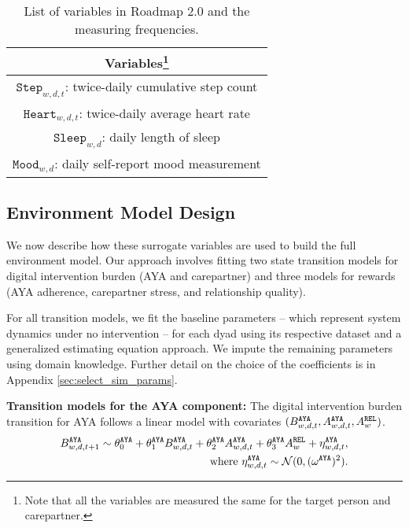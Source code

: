 \begin{table}[hpt]
    \centering
    \caption{List of variables in Roadmap 2.0 and the measuring frequencies.}
    \begin{tabular}{c}
    \hline
    Variables\footnote{Note that all the variables are measured the same for the target person and carepartner.} \\
    \hline
    \hline
     $\texttt{Step}_{w, d, t}$: twice-daily cumulative step count\\
     $\texttt{Heart}_{w, d, t}$: twice-daily average heart rate\\
     $\texttt{Sleep}_{w, d}$: daily length of sleep\\
     $\texttt{Mood}_{w, d}$: daily self-report mood measurement\\
     \hline
    \end{tabular}
    \label{tab:roadmap_variable}
\end{table}

\subsection{Environment Model Design}

We now describe how these surrogate variables are used to build the full environment model. Our approach involves fitting two state transition models for digital intervention burden (AYA and carepartner) and three models for rewards (AYA adherence, carepartner stress, and relationship quality).

For all transition models, we fit the baseline parameters -- which represent system dynamics under no intervention --  for each dyad using its respective dataset and a generalized estimating equation \cite{hojsgaard2006r} approach. We impute the remaining parameters  using domain knowledge. Further detail on the choice of the coefficients is in Appendix \ref{sec:select_sim_params}. 

\textbf{Transition models for the AYA component: } The digital intervention burden transition for AYA follows a linear model with covariates $(B_{w,d,t}^{\tiny\texttt{AYA}}, A_{w,d,t}^{\tiny\texttt{AYA}}, A_{w}^{\tiny\texttt{REL}})$.
\begin{align}
\label{equ:B_transition_AYA}
    B_{w,d,t+1}^{\tiny\texttt{AYA}} \sim \theta^{\tiny\texttt{AYA}}_{0} + \theta_{1}^{\tiny\texttt{AYA}} B_{w,d,t}^{\tiny\texttt{AYA}} + \theta_{2}^{\tiny\texttt{AYA}} A_{w,d,t}^{\tiny\texttt{AYA}} + \theta_{3}^{\tiny\texttt{AYA}} A_{w}^{\tiny\texttt{REL}} + \eta_{w,d,t}^{\tiny\texttt{AYA}}, \nonumber\\
    \text{ where $\eta_{w,d,t}^{\tiny\texttt{AYA}} \sim \mathcal{N}(0, (\omega^{\tiny\texttt{AYA}})^2)$.} 
\end{align}
 

